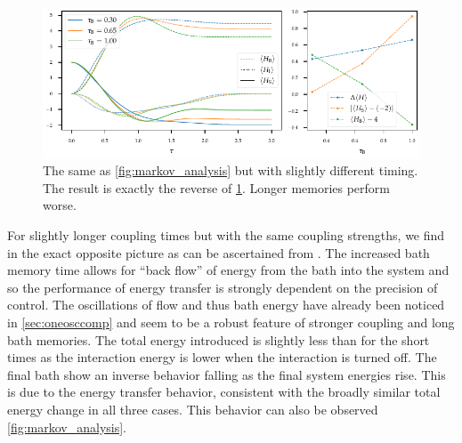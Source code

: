 \begin{figure}[htp]
  \centering
  \includegraphics{figs/one_bath_syst/markov_analysis_longer}
  \caption{\label{fig:markov_analysis_longer} The same as
    \cref{fig:markov_analysis} but with slightly different timing. The
    result is exactly the reverse of
    \cref{fig:markov_analysis_longer}. Longer memories perform worse.}
\end{figure}
For slightly longer coupling times but with the same coupling
strengths, we find in the exact opposite picture as can be ascertained
from .  The increased bath memory
time allows for ``back flow'' of energy from the bath into the system
and so the performance of energy transfer is strongly dependent on the
precision of control. The oscillations of flow and thus bath energy
have already been noticed in \cref{sec:oneosccomp} and seem to be a
robust feature of stronger coupling and long bath
memories.  The total energy
introduced is slightly less than for the short times as the
interaction energy is lower when the interaction is turned off.  The
final bath show an inverse behavior falling as the final system
energies rise. This is due to the energy transfer behavior, consistent
with the broadly similar total energy change in all three cases. This
behavior can also be observed \cref{fig:markov_analysis}.

